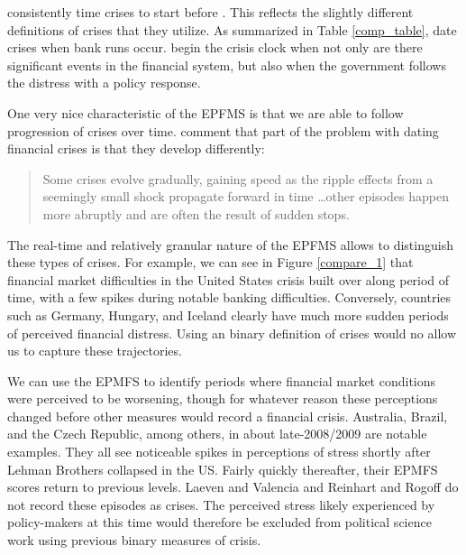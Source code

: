 \documentclass[]{article}
\begin{document}
\cite{Reinhart2009} consistently time crises to start before \cite{laeven2013}. This reflects the slightly different definitions of crises that they utilize. As summarized in Table \ref{comp_table}, \cite{Reinhart2009} date crises when bank runs occur. \cite{laeven2013} begin the crisis clock when not only are there significant events in the financial system, but also when the government follows the distress with a policy response.

One very nice characteristic of the EPFMS is that we are able to follow
progression of crises over time. \cite[227]{laeven2013} comment
that part of the problem with dating financial crises is that they
develop differently:

\begin{quote}
    Some crises evolve gradually, gaining speed as the ripple effects from a seemingly small shock propagate forward in time \ldots other episodes happen more abruptly and are often the result of sudden stops.
\end{quote}

The real-time and relatively granular nature of the EPFMS allows to
distinguish these types of crises. For example, we can see in Figure
\ref{compare_1} that financial market difficulties in the United States
crisis built over along period of time, with a few spikes during notable
banking difficulties. Conversely, countries such as Germany, Hungary,
and Iceland clearly have much more sudden periods of perceived financial
distress. Using an binary definition of crises would no allow us to
capture these trajectories.

We can use the EPMFS to identify periods where financial market
conditions were perceived to be worsening, though for whatever reason
these perceptions changed before other measures would record a financial
crisis. Australia, Brazil, and the Czech Republic, among others, in
about late-2008/2009 are notable examples. They all see noticeable
spikes in perceptions of stress shortly after Lehman Brothers collapsed
in the US. Fairly quickly thereafter, their EPMFS scores return to
previous levels. Laeven and Valencia and Reinhart and Rogoff do not
record these episodes as crises. The perceived stress likely experienced
by policy-makers at this time would therefore be excluded from political
science work using previous binary measures of crisis.
\end{document}
